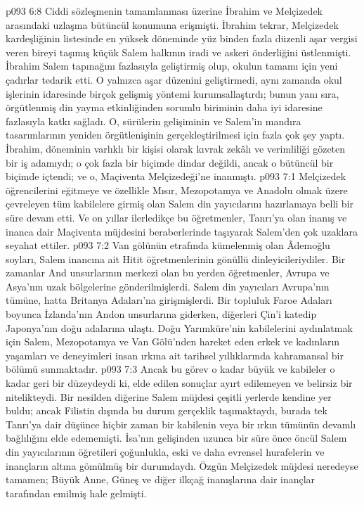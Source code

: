 \vs p093 6:8 Ciddi sözleşmenin tamamlanması üzerine İbrahim ve Melçizedek arasındaki uzlaşma bütüncül konumuna erişmişti. İbrahim tekrar, Melçizedek kardeşliğinin listesinde en yüksek döneminde yüz binden fazla düzenli aşar vergisi veren bireyi taşımış küçük Salem halkının iradi ve askeri önderliğini üstlenmişti. İbrahim Salem tapınağını fazlasıyla geliştirmiş olup, okulun tamamı için yeni çadırlar tedarik etti. O yalnızca aşar düzenini geliştirmedi, aynı zamanda okul işlerinin idaresinde birçok gelişmiş yöntemi kurumsallaştırdı; bunun yanı sıra, örgütlenmiş din yayma etkinliğinden sorumlu biriminin daha iyi idaresine fazlasıyla katkı sağladı. O, sürülerin gelişiminin ve Salem’in mandıra tasarımlarının yeniden örgütlenişinin gerçekleştirilmesi için fazla çok şey yaptı. İbrahim, döneminin varlıklı bir kişisi olarak kıvrak zekâlı ve verimliliği gözeten bir iş adamıydı; o çok fazla bir biçimde dindar değildi, ancak o bütüncül bir biçimde içtendi; ve o, Maçiventa Melçizedeği’ne inanmıştı.
\vs p093 7:1 Melçizedek öğrencilerini eğitmeye ve özellikle Mısır, Mezopotamya ve Anadolu olmak üzere çevreleyen tüm kabilelere girmiş olan Salem din yayıcılarını hazırlamaya belli bir süre devam etti. Ve on yıllar ilerledikçe bu öğretmenler, Tanrı’ya olan inanış ve inanca dair Maçiventa müjdesini beraberlerinde taşıyarak Salem’den çok uzaklara seyahat ettiler.
\vs p093 7:2 Van gölünün etrafında kümelenmiş olan Âdemoğlu soyları, Salem inancına ait Hitit öğretmenlerinin gönüllü dinleyicileriydiler. Bir zamanlar And unsurlarının merkezi olan bu yerden öğretmenler, Avrupa ve Asya’nın uzak bölgelerine gönderilmişlerdi. Salem din yayıcıları Avrupa’nın tümüne, hatta Britanya Adaları’na girişmişlerdi. Bir topluluk Faroe Adaları boyunca İzlanda’nın Andon unsurlarına giderken, diğerleri Çin’i katedip Japonya’nın doğu adalarına ulaştı. Doğu Yarımküre’nin kabilelerini aydınlatmak için Salem, Mezopotamya ve Van Gölü’nden hareket eden erkek ve kadınların yaşamları ve deneyimleri insan ırkına ait tarihsel yıllıklarında kahramansal bir bölümü sunmaktadır.
\vs p093 7:3 Ancak bu görev o kadar büyük ve kabileler o kadar geri bir düzeydeydi ki, elde edilen sonuçlar ayırt edilemeyen ve belirsiz bir nitelikteydi. Bir nesilden diğerine Salem müjdesi çeşitli yerlerde kendine yer buldu; ancak Filistin dışında bu durum gerçeklik taşımaktaydı, burada tek Tanrı’ya dair düşünce hiçbir zaman bir kabilenin veya bir ırkın tümünün devamlı bağlılığını elde edememişti. İsa’nın gelişinden uzunca bir süre önce öncül Salem din yayıcılarının öğretileri çoğunlukla, eski ve daha evrensel hurafelerin ve inançların altına gömülmüş bir durumdaydı. Özgün Melçizedek müjdesi neredeyse tamamen; Büyük Anne, Güneş ve diğer ilkçağ inanışlarına dair inançlar tarafından emilmiş hale gelmişti.
